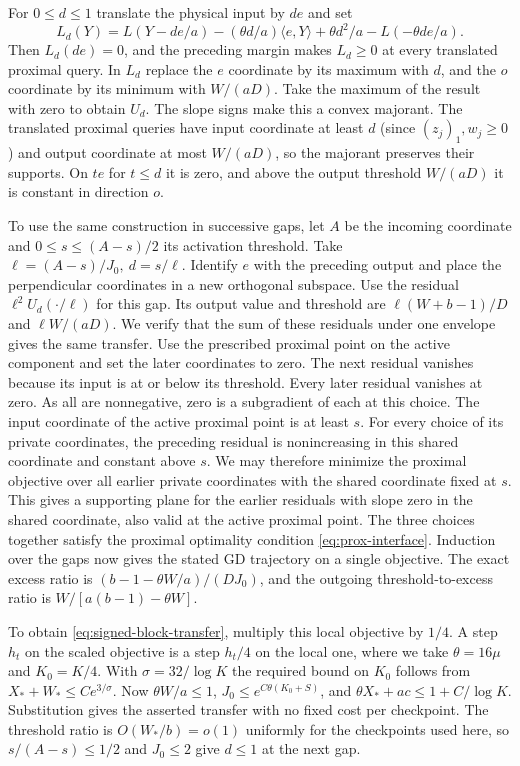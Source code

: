 \documentclass[11pt]{article}
\theoremstyle{definition}
\begin{document}
For \(0\le d\le1\) translate the physical input by \(de\) and set
\[
 L_d(Y)=L(Y-de/a)-(\theta d/a)\langle e,Y\rangle+
                  \theta d^2/a-L(-\theta de/a).
\]
Then \(L_d(de)=0\), and the preceding margin makes \(L_d\ge0\)
at every translated proximal query. In \(L_d\) replace the \(e\)
coordinate by its maximum with \(d\), and the \(o\) coordinate by
its minimum with \(W/(aD)\). Take the maximum of the result with
zero to obtain \(U_d\). The slope signs make this a convex majorant. The translated proximal queries have input coordinate at least \(d\) (since \((z_j)_1,w_j\ge0\)) and output coordinate at most \(W/(aD)\), so the majorant preserves their supports. On \(te\) for \(t\le d\)
it is zero, and above the output threshold \(W/(aD)\) it is constant
in direction \(o\).

To use the same construction in successive gaps, let \(A\) be the incoming coordinate and \(0\le s\le(A-s)/2\) its activation threshold. Take
\(\ell=(A-s)/J_0,\ d=s/\ell\). Identify \(e\) with the preceding
output and place the perpendicular coordinates in a new orthogonal subspace.
Use the residual \(\ell^2 U_d(\cdot/\ell)\) for this gap. Its output
value and threshold are \(\ell(W+b-1)/D\) and \(\ell W/(aD)\).
We verify that the sum of these residuals under one envelope gives the same
transfer. Use the prescribed proximal point on the active component and set
the later coordinates to zero. The next residual vanishes because its input
is at or below its threshold. Every later residual vanishes at zero. As
all are nonnegative, zero is a subgradient of each at this choice.
The input coordinate of the active proximal point is at least \(s\).
For every choice of its private coordinates, the preceding residual is
nonincreasing in this shared coordinate and constant above \(s\).
We may therefore minimize the proximal objective over all earlier private
coordinates with the shared coordinate fixed at \(s\). This gives a
supporting plane for the earlier residuals with slope zero in the
shared coordinate, also valid at the active proximal point. The three
choices together satisfy the proximal optimality condition
\eqref{eq:prox-interface}. Induction over the gaps now gives the stated
GD trajectory on a single objective. The exact excess ratio is
\((b-1-\theta W/a)/(D J_0)\), and the outgoing threshold-to-excess
ratio is \(W/[a(b-1)-\theta W]\).

To obtain \eqref{eq:signed-block-transfer}, multiply this local objective by
\(1/4\). A step \(h_t\) on the scaled objective is a step \(h_t/4\) on the
local one, where we take \(\theta=16\mu\) and \(K_0=K/4\). With \(\sigma=32/\log K\) the
required bound on \(K_0\) follows from \(X_*+W_*\le C e^{3/\sigma}\).
Now \(\theta W/a\le1\), \(J_0\le e^{C\theta(K_0+S)}\), and
\(\theta X_*+ac\le1+C/\log K\). Substitution gives the asserted
transfer with no fixed cost per checkpoint. The threshold ratio is
\(O(W_*/b)=o(1)\) uniformly for the checkpoints used here, so
\(s/(A-s)\le1/2\) and \(J_0\le2\) give \(d\le1\) at the next gap.
\end{document}
